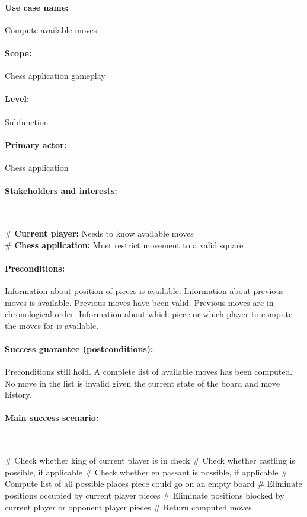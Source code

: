 \documentclass{article}
\begin{document}
\paragraph{Use case name:} Compute available moves

\paragraph{Scope:} Chess application gameplay

\paragraph{Level:} Subfunction

\paragraph{Primary actor:} Chess application

\paragraph{Stakeholders and interests:}\mbox{}\\
\begin{easylist}[itemize]
# \textbf{Current player:} Needs to know available moves\\
# \textbf{Chess application:} Must restrict movement to a valid square\\
\end{easylist}

\paragraph{Preconditions:} Information about position of pieces is available. Information about previous moves is available. Previous moves have been valid. Previous moves are in chronological order. Information about which piece or which player to compute the moves for is available.

\paragraph{Success guarantee (postconditions):} Preconditions still hold. A complete list of available moves has been computed. No move in the list is invalid given the current state of the board and move history.

\paragraph{Main success scenario:}\mbox{}\\
\begin{easylist}[enumerate]
# Check whether king of current player is in check
# Check whether castling is possible, if applicable
# Check whether en passant is possible, if applicable
# Compute list of all possible places piece could go on an empty board
# Eliminate positions occupied by current player pieces
# Eliminate positions blocked by current player or opponent player pieces
# Return computed moves
\end{easylist}
\end{document}
